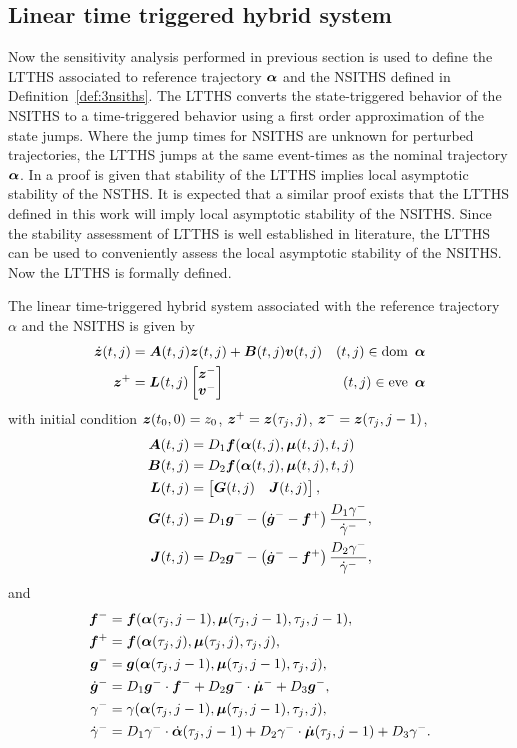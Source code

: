 \documentclass[../DC2017114Bouma.tex]{subfiles}
\begin{document}
\subsection{Linear time triggered hybrid system}
Now the sensitivity analysis performed in previous section is used to define the LTTHS associated to reference trajectory $\boldsymbol{\alpha}$ and the NSITHS defined in Definition~\ref{def:3nsiths}. The LTTHS converts the state-triggered behavior of the NSITHS to a time-triggered behavior using a first order approximation of the state jumps. Where the jump times for NSITHS are unknown for perturbed trajectories, the LTTHS jumps at the same event-times as the nominal trajectory $\boldsymbol{\alpha}$. In \cite{Rijnen2017} a proof is given that stability of the LTTHS implies local asymptotic stability of the NSTHS. It is expected that a similar proof exists that the LTTHS defined in this work will imply local asymptotic stability of the NSITHS. Since the stability assessment of LTTHS is well established in literature, the LTTHS can be used to conveniently assess the local asymptotic stability of the NSITHS. Now the LTTHS is formally defined.
\begin{mydef}[LTTHS]\label{def:3ltths}
The linear time-triggered hybrid system associated with the reference trajectory $\alpha$ and the NSITHS is given by
\begin{align}
\dot{{\boldsymbol{z}}}(t,j) &= {\boldsymbol{A}}(t,j){\boldsymbol{z}}(t,j) + {\boldsymbol{B}}(t,j){\boldsymbol{v}}(t,j) &(t,j)\in \operatorname{\textnormal{dom}}\ \boldsymbol{\alpha}\\
{\boldsymbol{z}}^+ &= {\boldsymbol{L}}(t,j) \begin{bmatrix}{\boldsymbol{z}}^- \\ {\boldsymbol{v}}^-\end{bmatrix} &(t,j)\in \operatorname{\textnormal{eve}}\ \boldsymbol{\alpha}
\end{align}
with initial condition ${\boldsymbol{z}}(t_0,0)=z_0$, ${\boldsymbol{z}}^+ = {\boldsymbol{z}}(\tau_j,j)$, ${\boldsymbol{z}}^- = {\boldsymbol{z}}(\tau_j,j-1)$,
\begin{align}
{\boldsymbol{A}}(t,j) &= D_1{\boldsymbol{f}}(\boldsymbol{\alpha}(t,j),\boldsymbol{\mu}(t,j),t,j)\\
{\boldsymbol{B}}(t,j) &= D_2{\boldsymbol{f}}(\boldsymbol{\alpha}(t,j),\boldsymbol{\mu}(t,j),t,j)\\
{\boldsymbol{L}}(t,j) &= \begin{bmatrix}{\boldsymbol{G}}(t,j) & {\boldsymbol{J}}(t,j)\end{bmatrix},\\
{\boldsymbol{G}}(t,j) &= D_1{\boldsymbol{g}}^- - \left(\dot{{\boldsymbol{g}}}^- - {\boldsymbol{f}}^+\right)\frac{D_1\gamma^-}{\dot{\gamma}^-},\\
{\boldsymbol{J}}(t,j) &= D_2{\boldsymbol{g}}^- - \left(\dot{{\boldsymbol{g}}}^- - {\boldsymbol{f}}^+\right)\frac{D_2\gamma^-}{\dot{\gamma}^-},
\end{align}
and
\begin{align}
{\boldsymbol{f}}^- &= {\boldsymbol{f}}(\boldsymbol{\alpha}(\tau_j,j-1),\boldsymbol{\mu}(\tau_j,j-1),\tau_j,j-1),\\
{\boldsymbol{f}}^+ &= {\boldsymbol{f}}(\boldsymbol{\alpha}(\tau_j,j),\boldsymbol{\mu}(\tau_j,j),\tau_j,j),\\
{\boldsymbol{g}}^- &= {\boldsymbol{g}}(\boldsymbol{\alpha}(\tau_j,j-1),\boldsymbol{\mu}(\tau_j,j-1),\tau_j,j),\\
\dot{{\boldsymbol{g}}}^- &= D_1{\boldsymbol{g}}^-\cdot {\boldsymbol{f}}^- + D_2{\boldsymbol{g}}^-\cdot \dot{\boldsymbol{\mu}}^- + D_3{\boldsymbol{g}}^-,\\
\gamma^- &= \gamma(\boldsymbol{\alpha}(\tau_j,j-1),\boldsymbol{\mu}(\tau_j,j-1),\tau_j,j),\\
\dot{\gamma}^- &= D_1\gamma^-\cdot\dot{\boldsymbol{\alpha}}(\tau_j,j-1) + D_2\gamma^-\cdot\dot{\boldsymbol{\mu}}(\tau_j,j-1) + D_3\gamma^-.
\end{align}
\end{mydef}
\end{document}
